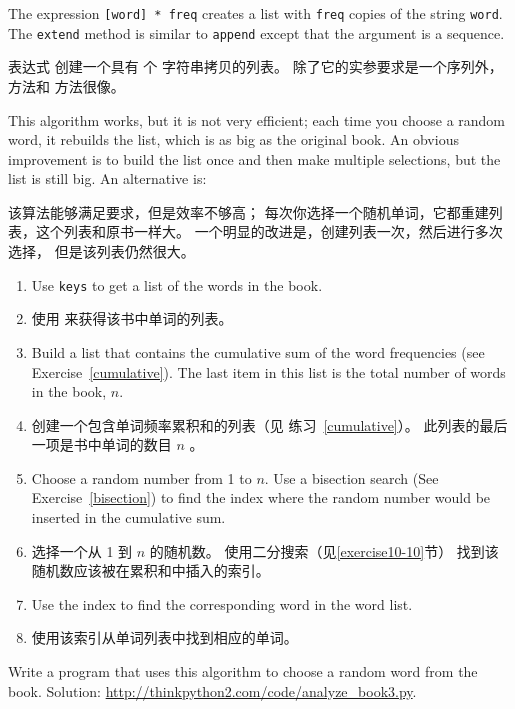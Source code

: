 %
The expression {\tt [word] * freq} creates a list with {\tt freq}
copies of the string {\tt word}.  The {\tt extend}
method is similar to {\tt append} except that the argument is
a sequence.

表达式  创建一个具有  个  字符串拷贝的列表。
除了它的实参要求是一个序列外， 方法和  方法很像。

This algorithm works, but it is not very efficient; each time you
choose a random word, it rebuilds the list, which is as big as
the original book.  An obvious improvement is to build the list
once and then make multiple selections, but the list is still big.
An alternative is:

该算法能够满足要求，但是效率不够高；
每次你选择一个随机单词，它都重建列表，这个列表和原书一样大。
一个明显的改进是，创建列表一次，然后进行多次选择， 但是该列表仍然很大。

\begin{enumerate}
\item Use {\tt keys} to get a list of the words in the book.

\item 使用  来获得该书中单词的列表。

\item Build a list that contains the cumulative sum of the word
  frequencies (see Exercise~\ref{cumulative}).  The last item
  in this list is the total number of words in the book, $n$.

\item 创建一个包含单词频率累积和的列表（见 练习~\ref{cumulative}）。  此列表的最后一项是书中单词的数目 $n$ 。

\item Choose a random number from 1 to $n$.  Use a bisection search
  (See Exercise~\ref{bisection}) to find the index where the random
  number would be inserted in the cumulative sum.

\item 选择一个从 1 到 $n$ 的随机数。 使用二分搜索（见\ref{exercise10-10}节）  找到该随机数应该被在累积和中插入的索引。

\item Use the index to find the corresponding word in the word list.

\item 使用该索引从单词列表中找到相应的单词。
\end{enumerate}

\begin{exercise}
\label{randhist}
Write a program that uses this algorithm to choose a random word from
the book.  Solution:
\url{http://thinkpython2.com/code/analyze_book3.py}.
\end{exercise}


